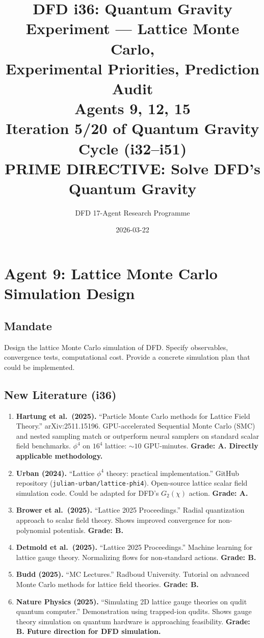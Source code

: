 \documentclass[11pt,a4paper]{article}
\title{DFD i36: Quantum Gravity Experiment --- Lattice Monte Carlo,\\Experimental Priorities, Prediction Audit\\[6pt]
\large Agents 9, 12, 15\\[6pt]
\normalsize Iteration 5/20 of Quantum Gravity Cycle (i32--i51)\\
PRIME DIRECTIVE: Solve DFD's Quantum Gravity}
\author{DFD 17-Agent Research Programme}
\date{2026-03-22}
\begin{document}
\maketitle
\tableofcontents
\newpage

\section{Agent 9: Lattice Monte Carlo Simulation Design}
\label{sec:agent9}

\subsection{Mandate}

Design the lattice Monte Carlo simulation of DFD. Specify observables, convergence tests, computational cost. Provide a concrete simulation plan that could be implemented.

\subsection{New Literature (i36)}

\begin{enumerate}
\item \textbf{Hartung et al.\ (2025).} ``Particle Monte Carlo methods for Lattice Field Theory.'' arXiv:2511.15196. GPU-accelerated Sequential Monte Carlo (SMC) and nested sampling match or outperform neural samplers on standard scalar field benchmarks. $\phi^4$ on $16^4$ lattice: $\sim 10$ GPU-minutes. \textbf{Grade: A. Directly applicable methodology.}

\item \textbf{Urban (2024).} ``Lattice $\phi^4$ theory: practical implementation.'' GitHub repository (\texttt{julian-urban/lattice-phi4}). Open-source lattice scalar field simulation code. Could be adapted for DFD's $G_2(\chi)$ action. \textbf{Grade: A.}

\item \textbf{Brower et al.\ (2025).} ``Lattice 2025 Proceedings.'' Radial quantization approach to scalar field theory. Shows improved convergence for non-polynomial potentials. \textbf{Grade: B.}

\item \textbf{Detmold et al.\ (2025).} ``Lattice 2025 Proceedings.'' Machine learning for lattice gauge theory. Normalizing flows for non-standard actions. \textbf{Grade: B.}

\item \textbf{Budd (2025).} ``MC Lectures.'' Radboud University. Tutorial on advanced Monte Carlo methods for lattice field theories. \textbf{Grade: B.}

\item \textbf{Nature Physics (2025).} ``Simulating 2D lattice gauge theories on qudit quantum computer.'' Demonstration using trapped-ion qudits. Shows gauge theory simulation on quantum hardware is approaching feasibility. \textbf{Grade: B. Future direction for DFD simulation.}
\end{enumerate}
\end{document}
